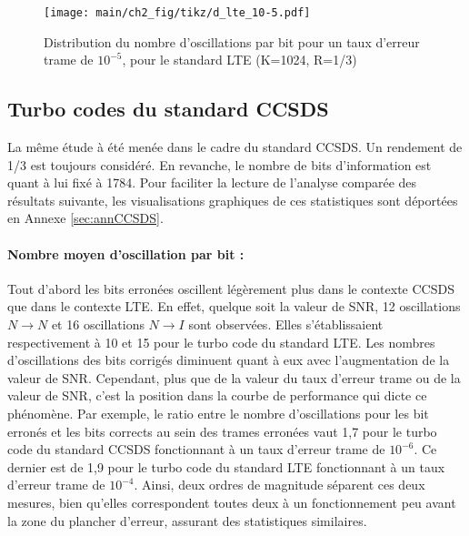 \begin{figure}[!t]
	\centering
	\texttt{[image: main/ch2\_fig/tikz/d\_lte\_10-5.pdf]}
	\caption{Distribution du nombre d'oscillations par bit pour un taux d'erreur trame de $10^{-5}$, pour le standard LTE (K=1024, R=1/3) \label{fig:d_lte_10-5}}
\end{figure}

\subsection{Turbo codes du standard CCSDS}
La même étude à été menée dans le cadre du standard CCSDS. Un rendement de 1/3 est toujours considéré. En revanche, le nombre 
de bits d'information est quant à lui fixé à 1784. Pour faciliter la lecture de l'analyse comparée des résultats suivante, 
les visualisations graphiques de ces statistiques sont déportées en Annexe \ref{sec:annCCSDS}.
\paragraph*{Nombre moyen d'oscillation par bit : } 
Tout d'abord les bits erronées oscillent légèrement plus dans le contexte CCSDS que dans le contexte LTE. En effet, 
quelque soit la valeur de SNR, 12 oscillations $N\rightarrow N$ et 16 oscillations $N\rightarrow I$ sont observées. Elles 
s'établissaient respectivement à 10 et 15 pour le turbo code du standard LTE. Les nombres d'oscillations des bits corrigés diminuent quant à eux
avec l’augmentation de la valeur de SNR. Cependant, plus que de la valeur du taux d'erreur trame ou de la valeur de SNR,
c'est la position dans la courbe de performance qui dicte ce phénomène. Par exemple, le ratio entre le nombre 
d'oscillations pour les bit erronés et les bits corrects au sein des trames erronées vaut 1,7 pour le turbo code du 
standard CCSDS fonctionnant à un taux d'erreur trame de $10^{-6}$. Ce dernier est de 1,9 pour le turbo code du 
standard LTE fonctionnant à un taux d'erreur trame de $10^{-4}$. Ainsi, deux ordres de magnitude séparent ces deux mesures,
bien qu'elles correspondent toutes deux à un fonctionnement peu avant la zone du plancher d'erreur, assurant des statistiques similaires.
